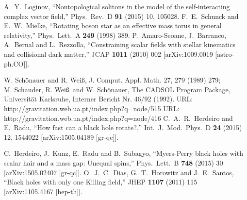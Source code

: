 \documentclass{article}
\numberwithin{equation}{section}
\begin{document}
\begin{small}
\begin{thebibliography}{99}
  A.~Y.~Loginov,
  ``Nontopological solitons in the model of the self-interacting complex vector field,''
  Phys.\ Rev.\ D {\bf 91} (2015) 10,  105028.
  F.~E.~Schunck and E.~W.~Mielke,
  ``Rotating boson star as an effective mass torus in general relativity,''
  Phys.\ Lett.\ A {\bf 249} (1998) 389.
  P.~Amaro-Seoane, J.~Barranco, A.~Bernal and L.~Rezzolla,
  ``Constraining scalar fields with stellar kinematics and collisional dark matter,''
  JCAP {\bf 1011} (2010) 002
  [arXiv:1009.0019 [astro-ph.CO]].

 W. Sch\"onauer and R. Wei\ss ,
 J. Comput. Appl. Math. 27, 279 (1989) 279;
 \\
 M. Schauder, R. Wei\ss\ and W. Sch\"onauer,
 The CADSOL Program Package,
 Universit\"at Karlsruhe, Interner Bericht Nr. 46/92 (1992).  
 URL: http://gravitation.web.ua.pt/index.php?q=node/515
URL: http://gravitation.web.ua.pt/index.php?q=node/416
  C.~A.~R.~Herdeiro and E.~Radu,
  ``How fast can a black hole rotate?,''
  Int.\ J.\ Mod.\ Phys.\ D {\bf 24} (2015) 12,  1544022
  [arXiv:1505.04189 [gr-qc]].

  C.~Herdeiro, J.~Kunz, E.~Radu and B.~Subagyo,
  ``Myers-Perry black holes with scalar hair and a mass gap: Unequal spins,''
  Phys.\ Lett.\ B {\bf 748} (2015) 30
  [arXiv:1505.02407 [gr-qc]].
  O.~J.~C.~Dias, G.~T.~Horowitz and J.~E.~Santos,
  ``Black holes with only one Killing field,''
  JHEP {\bf 1107} (2011) 115
  [arXiv:1105.4167 [hep-th]].



\end{thebibliography}
\end{small}
\end{document}
